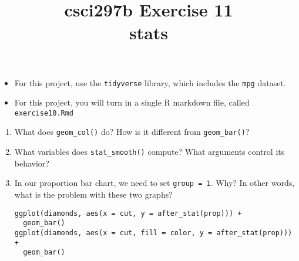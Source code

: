\documentclass[12pt]{article}
\title{csci297b Exercise 11\\stats
  }
\date{}
\newcommand{\bi}{\begin{itemize}}
\newcommand{\ei}{\end{itemize}}
\newcommand{\li}{\item}
\begin{document}
\maketitle

\bi
\li
For this project, use the {\tt tidyverse} library, which includes the {\tt mpg} dataset.
\li
For this project, you will turn in a single R markdown file, called \verb|exercise10.Rmd|

\ei
\begin{enumerate}
\item

What does \verb|geom_col()| do? How is it different from \verb|geom_bar()|?
\item
What variables does \verb|stat_smooth()| compute? What arguments control its behavior?
\item
In our proportion bar chart, we need to set \verb|group = 1|. Why? In other words, what is the problem with these two graphs?
\begin{verbatim}
ggplot(diamonds, aes(x = cut, y = after_stat(prop))) + 
  geom_bar()
ggplot(diamonds, aes(x = cut, fill = color, y = after_stat(prop))) + 
  geom_bar()
\end{verbatim}
\end{enumerate}
\end{document}
